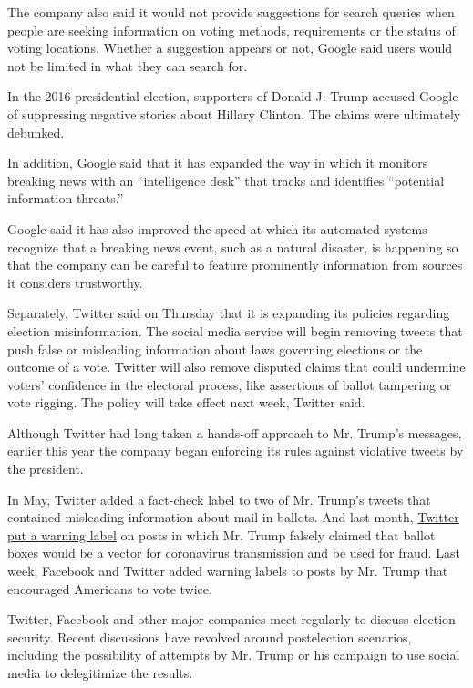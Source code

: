 The company also said it would not provide suggestions for search
queries when people are seeking information on voting methods,
requirements or the status of voting locations. Whether a suggestion
appears or not, Google said users would not be limited in what they can
search for.

In the 2016 presidential election, supporters of Donald J. Trump accused
Google of suppressing negative stories about Hillary Clinton. The claims
were ultimately debunked.

In addition, Google said that it has expanded the way in which it
monitors breaking news with an ``intelligence desk'' that tracks and
identifies ``potential information threats.''

Google said it has also improved the speed at which its automated
systems recognize that a breaking news event, such as a natural
disaster, is happening so that the company can be careful to feature
prominently information from sources it considers trustworthy.

Separately, Twitter said on Thursday that it is expanding its policies
regarding election misinformation. The social media service will begin
removing tweets that push false or misleading information about laws
governing elections or the outcome of a vote. Twitter will also remove
disputed claims that could undermine voters' confidence in the electoral
process, like assertions of ballot tampering or vote rigging. The policy
will take effect next week, Twitter said.

Although Twitter had long taken a hands-off approach to Mr. Trump's
messages, earlier this year the company began enforcing its rules
against violative tweets by the president.

In May, Twitter added a fact-check label to two of Mr. Trump's tweets
that contained misleading information about mail-in ballots. And last
month,
\href{https://www.nytimes3xbfgragh.onion/2020/08/23/technology/twitter-trump-tweet-warning.html}{Twitter
put a warning label} on posts in which Mr. Trump falsely claimed that
ballot boxes would be a vector for coronavirus transmission and be used
for fraud. Last week, Facebook and Twitter added warning labels to posts
by Mr. Trump that encouraged Americans to vote twice.

Twitter, Facebook and other major companies meet regularly to discuss
election security. Recent discussions have revolved around postelection
scenarios, including the possibility of attempts by Mr. Trump or his
campaign to use social media to delegitimize the results.

